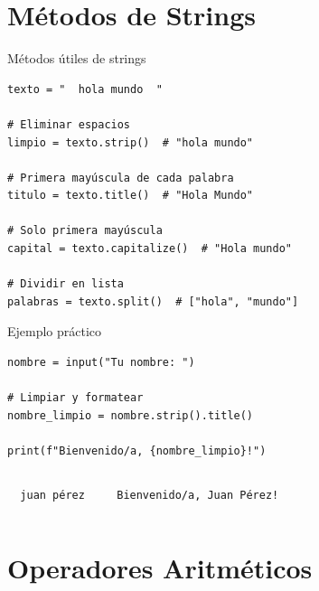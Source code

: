 \documentclass{beamer}
\begin{document}
\section{Métodos de Strings}

\begin{frame}[fragile]{Métodos útiles de strings \ \faTools}

\begin{lstlisting}
texto = "  hola mundo  "

# Eliminar espacios
limpio = texto.strip()  # "hola mundo"

# Primera mayúscula de cada palabra
titulo = texto.title()  # "Hola Mundo"

# Solo primera mayúscula
capital = texto.capitalize()  # "Hola mundo"

# Dividir en lista
palabras = texto.split()  # ["hola", "mundo"]
\end{lstlisting}
\end{frame}

\begin{frame}[fragile]{Ejemplo práctico \ \faUserEdit}

\begin{lstlisting}
nombre = input("Tu nombre: ")

# Limpiar y formatear
nombre_limpio = nombre.strip().title()

print(f"Bienvenido/a, {nombre_limpio}!")
\end{lstlisting}

\vspace{0.2cm}
\begin{columns}[T]
\begin{tcolorbox}[colback=blue!10,colframe=blue,title={\small\faArrowDown \ Entrada},coltitle=fg0,left=2pt,right=2pt,top=2pt,bottom=2pt]
\small\texttt{\ \ juan pérez\ \ }
\end{tcolorbox}

\begin{tcolorbox}[colback=green!10,colframe=green,title={\small\faArrowUp \ Salida},coltitle=fg0,left=2pt,right=2pt,top=2pt,bottom=2pt]
\small\texttt{Bienvenido/a, Juan Pérez!}
\end{tcolorbox}
\end{columns}
\end{frame}

\section{Operadores Aritméticos}
\end{document}
